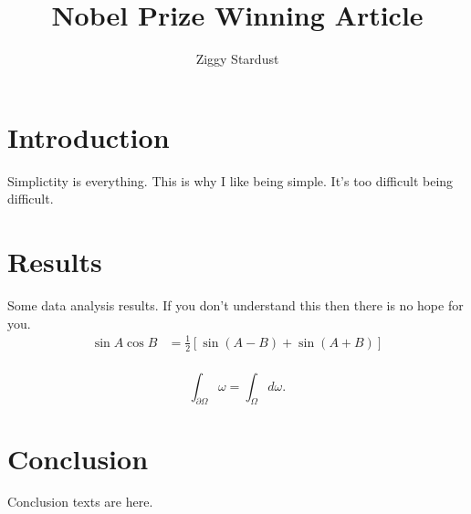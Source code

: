 \documentclass{article}
\title{Nobel Prize Winning Article}
\author{Ziggy Stardust}
\begin{document}

\maketitle
\section{Introduction}
Simplictity is everything. This is why I like being simple. It's too difficult being difficult.
\section{Results}
Some data analysis results. If you don't understand this then there is no hope for you.
 \begin{align*}
    \sin A \cos B &= \frac{1}{2}\left[ \sin(A-B)+\sin(A+B) \right] \\
 \end{align*}
 
\begin{equation*}
\int_{\partial \Omega} \omega = \int_{\Omega} d\omega.
\end{equation*}

\section{Conclusion}
Conclusion texts are here.
\end{document}
